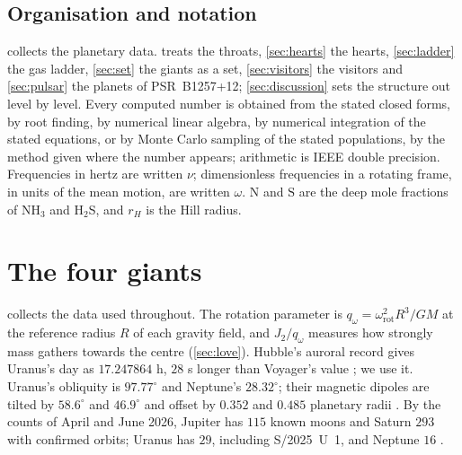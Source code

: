 \documentclass[11pt]{article}
\theoremstyle{definition}\newtheorem{definition}[theorem]{Definition}
\theoremstyle{remark}\newtheorem{remark}[theorem]{Remark}
\begin{document}
\subsection{Organisation and notation}\label{sec:org}
 collects the planetary data.  treats the throats, \cref{sec:hearts} the hearts, \cref{sec:ladder} the gas ladder, \cref{sec:set} the giants as a set, \cref{sec:visitors} the visitors and \cref{sec:pulsar} the planets of PSR~B1257+12; \cref{sec:discussion} sets the structure out level by level. Every computed number is obtained from the stated closed forms, by root finding, by numerical linear algebra, by numerical integration of the stated equations, or by Monte Carlo sampling of the stated populations, by the method given where the number appears; arithmetic is IEEE double precision. Frequencies in hertz are written $\nu$; dimensionless frequencies in a rotating frame, in units of the mean motion, are written $\omega$. $\mathrm N$ and $\mathrm S$ are the deep mole fractions of NH$_3$ and H$_2$S, and $r_H$ is the Hill radius.

\section{The four giants}\label{sec:giants}
 collects the data used throughout. The rotation parameter is $q_\omega=\omega_\mathrm{rot}^2R^3/GM$ at the reference radius $R$ of each gravity field, and $J_2/q_\omega$ measures how strongly mass gathers towards the centre (\cref{sec:love}). Hubble's auroral record gives Uranus's day as $17.247864$ h, $28$ s longer than Voyager's value \cite{Lamy}; we use it. Uranus's obliquity is $97.77^\circ$ and Neptune's $28.32^\circ$; their magnetic dipoles are tilted by $58.6^\circ$ and $46.9^\circ$ and offset by $0.352$ and $0.485$ planetary radii \cite{NSSDCU,NSSDCN}. By the counts of April and June 2026, Jupiter has $115$ known moons and Saturn $293$ with confirmed orbits; Uranus has $29$, including S/2025~U~1, and Neptune $16$ \cite{WikiMoons}.
\end{document}
